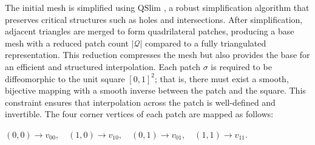 The initial mesh is simplified using QSlim \cite{garland1997}, a robust simplification algorithm that preserves critical structures such as holes and intersections.
After simplification, adjacent triangles are merged to form quadrilateral patches, producing a base mesh with a reduced patch count $|\mathcal{Q}|$ compared to a fully triangulated representation.
This reduction compresses the mesh but also provides the base for an efficient and structured interpolation.
Each patch $\sigma$ is required to be diffeomorphic to the unit square $[0,1]^2$; that is, there must exist a smooth, bijective mapping with a smooth inverse between the patch and the square.
This constraint ensures that interpolation across the patch is well-defined and invertible.
The four corner vertices of each patch are mapped as follows: 

\((0,0)\rightarrow v_{00}, \quad (1,0)\rightarrow v_{10}, \quad (0,1)\rightarrow v_{01}, \quad (1,1)\rightarrow v_{11}\).

